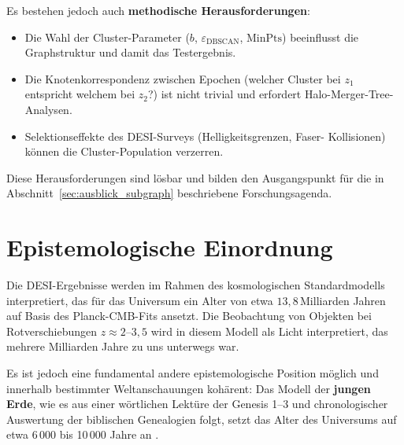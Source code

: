 ﻿\documentclass[a4paper,12pt]{article}
\theoremstyle{definition}
\theoremstyle{remark}
\begin{document}
Es bestehen jedoch auch \textbf{methodische Herausforderungen}:

\begin{itemize}
  \item Die Wahl der Cluster-Parameter ($b$, $\varepsilon_\mathrm{DBSCAN}$,
    $\mathrm{MinPts}$) beeinflusst die Graphstruktur und damit das Testergebnis.
  \item Die Knotenkorrespondenz zwischen Epochen (welcher Cluster bei $z_1$
    entspricht welchem bei $z_2$?) ist nicht trivial und erfordert
    Halo-Merger-Tree-Analysen.
  \item Selektionseffekte des DESI-Surveys (Helligkeitsgrenzen, Faser-
    Kollisionen) können die Cluster-Population verzerren.
\end{itemize}

Diese Herausforderungen sind lösbar und bilden den Ausgangspunkt für
die in Abschnitt~\ref{sec:ausblick_subgraph} beschriebene Forschungsagenda.

\section{Epistemologische Einordnung}
\label{sec:schöpfung}

Die DESI-Ergebnisse werden im Rahmen des kosmologischen Standardmodells
interpretiert, das für das Universum ein Alter von etwa $13{,}8$\,Milliarden
Jahren auf Basis des Planck-CMB-Fits ansetzt. Die Beobachtung von Objekten
bei Rotverschiebungen $z \approx 2$--$3{,}5$ wird in diesem Modell als
Licht interpretiert, das mehrere Milliarden Jahre zu uns unterwegs war.

Es ist jedoch eine fundamental andere epistemologische Position möglich und
innerhalb bestimmter Weltanschauungen kohärent: Das Modell der \textbf{jungen
Erde}, wie es aus einer wörtlichen Lektüre der Genesis 1--3 und
chronologischer Auswertung der biblischen Genealogien folgt, setzt das Alter
des Universums auf etwa 6\,000 bis 10\,000 Jahre an \cite{sarfati2004,
humphreys1994}.
\end{document}
